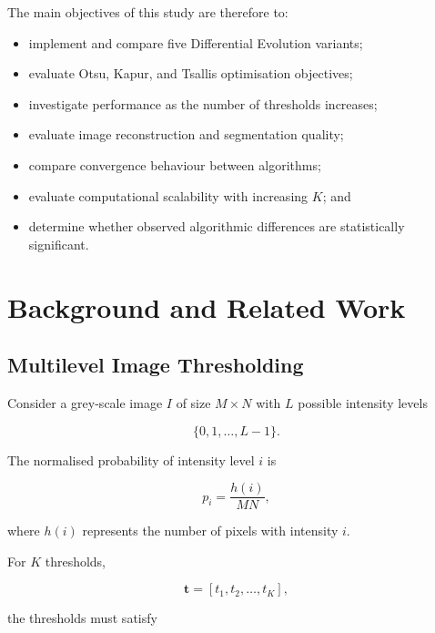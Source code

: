 \documentclass[review,authoryear]{elsarticle}
\begin{document}
The main objectives of this study are therefore to:

\begin{itemize}
    \item implement and compare five Differential Evolution variants;
    \item evaluate Otsu, Kapur, and Tsallis optimisation objectives;
    \item investigate performance as the number of thresholds increases;
    \item evaluate image reconstruction and segmentation quality;
    \item compare convergence behaviour between algorithms;
    \item evaluate computational scalability with increasing $K$; and
    \item determine whether observed algorithmic differences are
          statistically significant.
\end{itemize}





\section{Background and Related Work}
\label{sec:background}

\subsection{Multilevel Image Thresholding}

Consider a grey-scale image $I$ of size $M \times N$ with
$L$ possible intensity levels

\begin{equation}
\{0,1,\ldots,L-1\}.
\end{equation}

The normalised probability of intensity level $i$ is

\begin{equation}
p_i =
\frac{h(i)}{M N},
\end{equation}

where $h(i)$ represents the number of pixels with intensity $i$.

For $K$ thresholds,

\begin{equation}
\mathbf{t} =
[t_1,t_2,\ldots,t_K],
\end{equation}

the thresholds must satisfy
\end{document}
